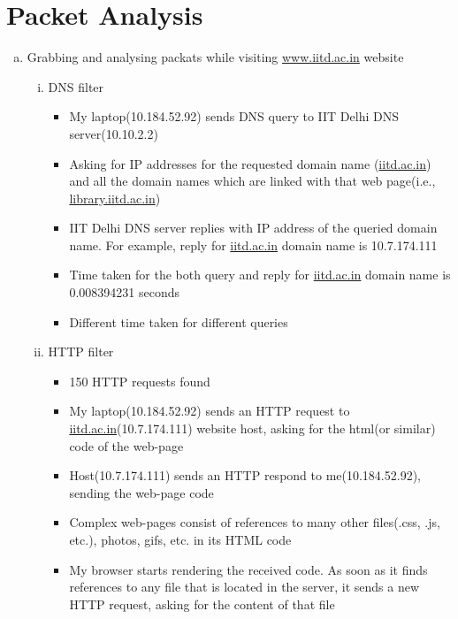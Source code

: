 \documentclass{article}
\begin{document}
\section{Packet Analysis}
    \begin{enumerate}[a)]
        \item Grabbing and analysing packats while visiting \href{www.iitd.ac.in}{www.iitd.ac.in} website
            \begin{enumerate}[i)]
                \item DNS filter
                    \begin{itemize}
                        \item My laptop(10.184.52.92) sends DNS query to IIT Delhi DNS server(10.10.2.2)
                        \item Asking for IP addresses for the requested domain name (\href{www.iitd.ac.in}{iitd.ac.in}) and all the domain names which are linked with that web page(i.e., \href{www.library.iitd.ac.in}{library.iitd.ac.in})
                        \item IIT Delhi DNS server replies with IP address of the queried domain name. For example, reply for \href{www.iitd.ac.in}{iitd.ac.in} domain name is 10.7.174.111
                        \item Time taken for the both query and reply for \href{www.iitd.ac.in}{iitd.ac.in} domain name is 0.008394231 seconds
                        \item Different time taken for different queries
                    \end{itemize}{}
                \item HTTP filter
                    \begin{itemize}
                        \item 150 HTTP requests found
                        \item My laptop(10.184.52.92) sends an HTTP request to \href{www.iitd.ac.in}{iitd.ac.in}(10.7.174.111) website host, asking for the html(or similar) code of the web-page
                        \item Host(10.7.174.111) sends an HTTP respond to me(10.184.52.92), sending the web-page code
                        \item Complex web-pages consist of references to many other files(.css, .js, etc.), photos, gifs,  etc. in its HTML code
                        \item My browser starts rendering the received code. As soon as it finds references to any file that is located in the server, it sends a new HTTP request, asking for the content of that file

\end{itemize}
\end{enumerate}
\end{enumerate}
\end{document}
